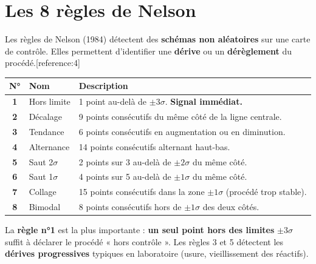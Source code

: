 \documentclass[11pt,a4paper]{article}
\begin{document}
\section*{\faListOl\quad Les 8 règles de Nelson}

Les règles de Nelson (1984) détectent des \textbf{schémas non aléatoires} sur une carte de contrôle. Elles permettent d'identifier une \textbf{dérive} ou un \textbf{dérèglement} du procédé.[reference:4]

\vspace{0.3cm}

\begin{tabularx}{\linewidth}{|c|p{3.2cm}|X|}
\hline
\rowcolor{soft}
\textbf{N°} & \textbf{Nom} & \textbf{Description} \\ \hline
\textbf{1} & Hors limite & 1 point au-delà de \(\pm 3\sigma\). \textbf{Signal immédiat.} \\ \hline
\textbf{2} & Décalage & 9 points consécutifs du même côté de la ligne centrale. \\ \hline
\textbf{3} & Tendance & 6 points consécutifs en augmentation ou en diminution. \\ \hline
\textbf{4} & Alternance & 14 points consécutifs alternant haut-bas. \\ \hline
\textbf{5} & Saut 2\(\sigma\) & 2 points sur 3 au-delà de \(\pm 2\sigma\) du même côté. \\ \hline
\textbf{6} & Saut 1\(\sigma\) & 4 points sur 5 au-delà de \(\pm 1\sigma\) du même côté. \\ \hline
\textbf{7} & Collage & 15 points consécutifs dans la zone \(\pm 1\sigma\) (procédé trop stable). \\ \hline
\textbf{8} & Bimodal & 8 points consécutifs hors de \(\pm 1\sigma\) des deux côtés. \\ \hline
\end{tabularx}

\vspace{0.3cm}

\begin{attention}[title={\faExclamationTriangle\quad À retenir absolument}]
La \textbf{règle n°1} est la plus importante : \textbf{un seul point hors des limites} \(\pm 3\sigma\) suffit à déclarer le procédé « hors contrôle ». Les règles 3 et 5 détectent les \textbf{dérives progressives} typiques en laboratoire (usure, vieillissement des réactifs).
\end{attention}

\vspace{0.3cm}
\end{document}
